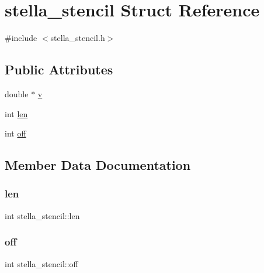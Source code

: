 \hypertarget{structstella__stencil}{}\section{stella\+\_\+stencil Struct Reference}
\label{structstella__stencil}


{\ttfamily \#include $<$stella\+\_\+stencil.\+h$>$}

\subsection*{Public Attributes}
\begin{DoxyCompactItemize}
\item 
double $\ast$ \mbox{\hyperlink{structstella__stencil_ad325456d2d21c02c405c49ea5f7c8705}{v}}
\item 
int \mbox{\hyperlink{structstella__stencil_a46f26c43543e4ee954a72441f3e1734d}{len}}
\item 
int \mbox{\hyperlink{structstella__stencil_aa170f48624cae782cfa3ae73393dbd00}{off}}
\end{DoxyCompactItemize}


\subsection{Member Data Documentation}
\mbox{\label{structstella__stencil_a46f26c43543e4ee954a72441f3e1734d}} 
\subsubsection{\texorpdfstring{len}{len}}
{\footnotesize\ttfamily int stella\+\_\+stencil\+::len}

\mbox{\label{structstella__stencil_aa170f48624cae782cfa3ae73393dbd00}} 
\subsubsection{\texorpdfstring{off}{off}}
{\footnotesize\ttfamily int stella\+\_\+stencil\+::off}

\mbox{\label{structstella__stencil_ad325456d2d21c02c405c49ea5f7c8705}} 
